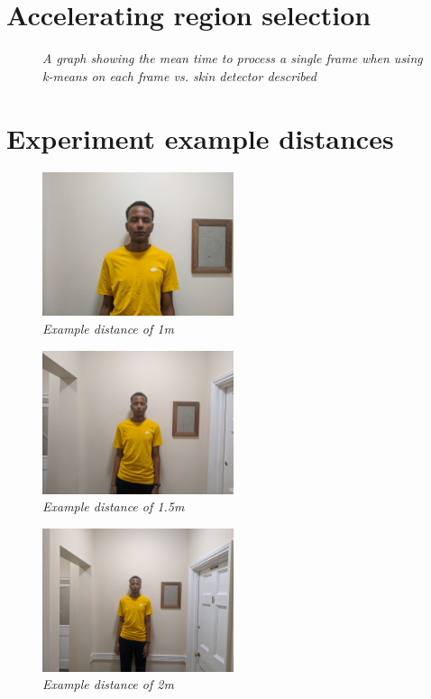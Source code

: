 \documentclass[12pt,twoside,notitlepage]{report}
\begin{document}
\begin{appendices}
\chapter{Accelerating region selection}
\begin{figure}[H]
    \centering
    \scalebox{0.5}{}
   \caption{\textit{A graph showing the mean time to process a single frame when using k-means on each frame vs. skin detector described}} 
\end{figure}
\chapter{Experiment example distances}
\label{appendix:experiments}
\begin{figure}[H]
    \centering
    \includegraphics[width=0.5\textwidth]{evaluation/1.jpg}
   \caption{\textit{Example distance of 1m}}
\end{figure}
\begin{figure}[H]
    \centering
    \includegraphics[width=0.5\textwidth]{evaluation/1-5.jpg}
   \caption{\textit{Example distance of 1.5m} }
\end{figure}
\begin{figure}[H]
    \centering
    \includegraphics[width=0.5\textwidth]{evaluation/2.jpg}
    \caption{\textit{Example distance of 2m} }
\end{figure}


\end{appendices}
\end{document}
